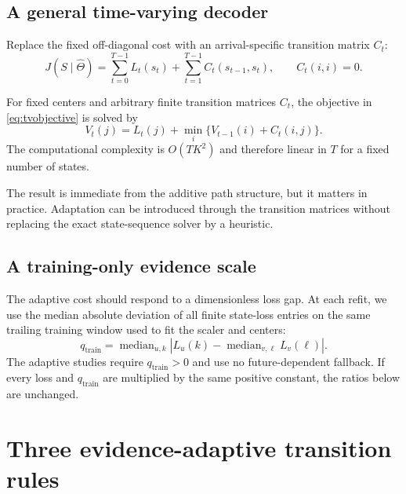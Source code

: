 \subsection{A general time-varying decoder}

Replace the fixed off-diagonal cost with an arrival-specific transition matrix
$C_t$:
\begin{equation}
J(S\mid\hat\Theta)=\sum_{t=0}^{T-1}L_t(s_t)
+\sum_{t=1}^{T-1}C_t(s_{t-1},s_t),
\qquad C_t(i,i)=0.
\label{eq:tvobjective}
\end{equation}

\begin{proposition}
For fixed centers and arbitrary finite transition matrices $C_t$, the objective
in \cref{eq:tvobjective} is solved by
\begin{equation}
V_t(j)=L_t(j)+\min_i\{V_{t-1}(i)+C_t(i,j)\}.
\label{eq:dp}
\end{equation}
The computational complexity is $O(TK^2)$ and therefore linear in $T$ for a fixed
number of states.
\end{proposition}

The result is immediate from the additive path structure, but it matters in
practice. Adaptation can be introduced through the transition matrices without
replacing the exact state-sequence solver by a heuristic.

\subsection{A training-only evidence scale}

The adaptive cost should respond to a dimensionless loss gap. At each refit, we
use the median absolute deviation of all finite state-loss entries on the same
trailing training window used to fit the scaler and centers:
\begin{equation}
q_{\mathrm{train}}=
\operatorname{median}_{u,k}
\left|L_u(k)-\operatorname{median}_{v,\ell}L_v(\ell)\right|.
\label{eq:qtrain}
\end{equation}
The adaptive studies require $q_{\mathrm{train}}>0$ and use no future-dependent
fallback. If every loss and $q_{\mathrm{train}}$ are multiplied by the same
positive constant, the ratios below are unchanged.

\section{Three evidence-adaptive transition rules}

